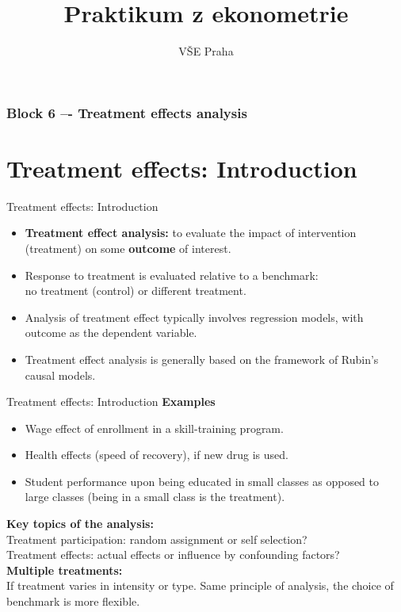 \documentclass{beamer}
\title[Block 6]{Praktikum z ekonometrie}
\author{VŠE Praha}
\institute[4EK417] 
{
\medskip
\textit{Tomáš Formánek} %
}
\date{} %
\begin{document}
\begin{frame}
\titlepage %
\end{frame}
\begin{frame}
\frametitle{Block 6 –- Treatment effects analysis 
} 
\tableofcontents 
\end{frame}
\section{Treatment effects: Introduction}
\begin{frame}{Treatment effects: Introduction}
\begin{itemize}
    \item \textbf{Treatment effect analysis:} to evaluate the impact of intervention (treatment) on some \textbf{outcome} of interest.
    \bigskip
    \item Response to treatment is evaluated relative to a benchmark:  \\no treatment (control) or different treatment. 
    \bigskip
    \item Analysis of treatment effect typically involves regression models, with outcome as the dependent variable.
    \bigskip
    \item Treatment effect analysis is generally based on the framework of Rubin's causal models. 
\end{itemize}
\end{frame}
\begin{frame}{Treatment effects: Introduction}
\textbf{Examples}\\ \medskip
\begin{itemize}
    \item Wage effect of enrollment in a skill-training program.
    \medskip
    \item Health effects (speed of recovery), if new drug is used.
    \medskip
    \item Student performance upon being educated in small classes as opposed to large classes (being in a small class is the treatment). 
\end{itemize}
\bigskip
\textbf{Key topics of the analysis:}\\
Treatment participation: random assignment or self selection?\\
Treatment effects: actual effects or influence by confounding factors?\\
\bigskip
\textbf{Multiple treatments:}\\ If treatment varies in intensity or type. Same principle of analysis, the choice of benchmark is more flexible.
\end{frame}
\end{document}
